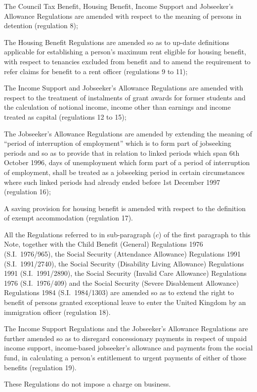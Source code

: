 \documentclass[12pt,a4paper]{article}
\begin{document}
The Council Tax Benefit, Housing Benefit, Income Support and Jobseeker’s Allowance Regulations are amended with respect to the meaning of persons in detention (regulation 8);

The Housing Benefit Regulations are amended so as to up-date definitions applicable for establishing a person’s maximum rent eligible for housing benefit, with respect to tenancies excluded from benefit and to amend the requirement to refer claims for benefit to a rent officer (regulations 9 to 11);

The Income Support and Jobseeker’s Allowance Regulations are amended with respect to the treatment of instalments of grant awards for former students and the calculation of notional income, income other than earnings and income treated as capital (regulations 12 to 15);

The Jobseeker’s Allowance Regulations are amended by extending the meaning of “period of interruption of employment” which is to form part of jobseeking periods and so as to provide that in relation to linked periods which span 6th October 1996, days of unemployment which form part of a period of interruption of employment, shall be treated as a jobseeking period in certain circumstances where such linked periods had already ended before 1st December 1997 (regulation 16);

A saving provision for housing benefit is amended with respect to the definition of exempt accommodation (regulation 17).

All the Regulations referred to in sub-paragraph ($c$)  of the first paragraph to this Note, together with the Child Benefit (General) Regulations 1976 (S.I.\ 1976/965), the Social Security (Attendance Allowance) Regulations 1991 (S.I.\ 1991/2740), the Social Security (Disability Living Allowance) Regulations 1991 (S.I.\ 1991/2890), the Social Security (Invalid Care Allowance) Regulations 1976 (S.I.\ 1976/409) and the Social Security (Severe Disablement Allowance) Regulations 1984 (S.I.\ 1984/1303) are amended so as to extend the right to benefit of persons granted exceptional leave to enter the United Kingdom by an immigration officer (regulation 18).

The Income Support Regulations and the Jobseeker’s Allowance Regulations are further amended so as to disregard concessionary payments in respect of unpaid income support, income-based jobseeker’s allowance and payments from the social fund, in calculating a person’s entitlement to urgent payments of either of those benefits (regulation 19).

These Regulations do not impose a charge on business. 
\end{document}
